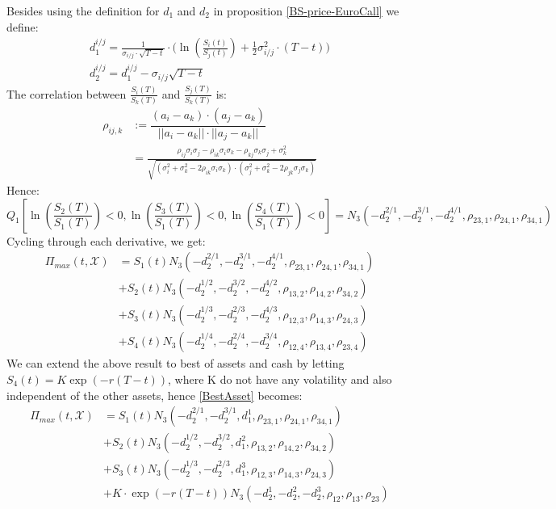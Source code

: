 Besides using the definition for $d_1$ and $d_2$ in proposition \ref{BS-price-EuroCall} we define:
\begin{align}
d^{i/j}_1 =\frac{1}{\sigma_{i/j}\cdot \sqrt{T-t}} \cdot \bigg( \ln(\frac{S_i(t)}{S_j(t)}) + \frac{1}{2} \sigma_{i/j}^2 \cdot (T-t) \bigg)\\
d^{i/j}_2=d^{i/j}_1-\sigma_{i/j} \sqrt{T-t}
\end{align}
The correlation between $\frac{S_i(T)}{S_k(T)}$ and $\frac{S_j(T)}{S_k(T)}$ is:
\begin{align}
\rho_{ij,k}&:= \dfrac{(a_i-a_k)\cdot(a_j-a_k)}{||a_i-a_k|| \cdot ||a_j-a_k||}\\
&=\frac{\rho_{ij}\sigma_i \sigma_j - \rho_{ik}\sigma_i \sigma_k - \rho_{kj}\sigma_k \sigma_j + \sigma_k^2}{\sqrt{(\sigma_i^2 + \sigma_k^2 - 2\rho_{ik}\sigma_i \sigma_k)\cdot(\sigma_j^2 + \sigma_k^2 - 2\rho_{jk}\sigma_j \sigma_k)}}
\end{align}
Hence:
$$Q_1[\ln(\frac{S_2(T)}{S_1(T)})<0, \ln(\frac{S_3(T)}{S_1(T)})<0, \ln(\frac{S_4(T)}{S_1(T)})<0]=N_3(-d_2^{2/1},-d_2^{3/1},-d_2^{4/1}, \rho_{23,1}, \rho_{24,1}, \rho_{34,1})$$
Cycling through each derivative, we get:
\begin{equation}\label{BestAsset}
\begin{split}
\Pi_{max}(t,\mathcal{X})&=S_1(t) N_3(-d_2^{2/1},-d_2^{3/1},-d_2^{4/1}, \rho_{23,1}, \rho_{24,1}, \rho_{34,1}) \\
&+S_2(t) N_3(-d_2^{1/2},-d_2^{3/2},-d_2^{4/2}, \rho_{13,2}, \rho_{14,2}, \rho_{34,2})\\
&+S_3(t) N_3(-d_2^{1/3},-d_2^{2/3},-d_2^{4/3}, \rho_{12,3}, \rho_{14,3}, \rho_{24,3}) \\
&+S_4(t) N_3(-d_2^{1/4},-d_2^{2/4},-d_2^{3/4}, \rho_{12,4}, \rho_{13,4}, \rho_{23,4})
\end{split}
\end{equation}
We can extend the above result to best of assets and cash by letting $S_4(t)=K\exp(-r(T-t))$, where K do not have any volatility and also independent of the other assets, hence \eqref{BestAsset} becomes:
\begin{equation}\label{BestAssetOrCash}
\begin{split}
\Pi_{max}(t,\mathcal{X})&=S_1(t) N_3(-d_2^{2/1},-d_2^{3/1},d_1^{1}, \rho_{23,1}, \rho_{24,1}, \rho_{34,1}) \\
&+S_2(t) N_3(-d_2^{1/2},-d_2^{3/2},d_1^{2}, \rho_{13,2}, \rho_{14,2}, \rho_{34,2})\\
&+S_3(t) N_3(-d_2^{1/3},-d_2^{2/3},d_1^{3}, \rho_{12,3}, \rho_{14,3}, \rho_{24,3}) \\
&+K\cdot \exp(-r(T-t)) N_3(-d_2^1,-d_2^2,-d_2^3, \rho_{12}, \rho_{13}, \rho_{23})
\end{split}
\end{equation}

